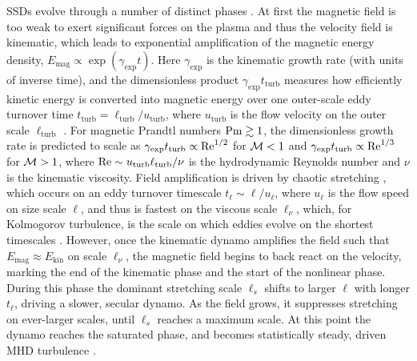     SSDs evolve through a number of distinct phases \citep{moffatt1970dynamo, vainshtein1972origin, kulsrud1992spectrum, schekochihin2002model, schekochihin2004simulations, maron2004nonlinear, rincon2019dynamo}. At first the magnetic field is too weak to exert significant forces on the plasma and thus the velocity field is kinematic, which leads to exponential amplification of the magnetic energy density, $E_\mathrm{mag} \propto \exp(\gamma_\mathrm{exp} t)$. Here $\gamma_\mathrm{exp}$ is the kinematic growth rate (with units of inverse time), and the dimensionless product $\gamma_\mathrm{exp} t_\mathrm{turb}$ measures how efficiently kinetic energy is converted into magnetic energy over one outer-scale eddy turnover time $t_\mathrm{turb} = \ell_\mathrm{turb}/u_\mathrm{turb}$, where $u_\mathrm{turb}$ is the flow velocity on the outer scale $\ell_\mathrm{turb}$ \citep{moffatt1970dynamo, kulsrud1992spectrum}. For magnetic Prandtl numbers $\mathrm{Pm} \gtrsim 1$, the dimensionless growth rate is predicted to scale as $\gamma_\mathrm{exp} t_\mathrm{turb} \propto \mathrm{Re}^{1/2}$ for $\mathcal{M} < 1$ and $\gamma_\mathrm{exp} t_\mathrm{turb} \propto \mathrm{Re}^{1/3}$ for $\mathcal{M} > 1$, where $\mathrm{Re} \sim u_\mathrm{turb} \ell_\mathrm{turb} / \nu$ is the hydrodynamic Reynolds number \citep{schober2012magnetic} and $\nu$ is the kinematic viscosity. Field amplification is driven by chaotic stretching \citep{rincon2019dynamo}, which occurs on an eddy turnover timescale $t_\ell \sim \ell/u_\ell$, where $u_\ell$ is the flow speed on size scale $\ell$, and thus is fastest on the viscous scale $\ell_\nu$, which, for Kolmogorov turbulence, is the scale on which eddies evolve on the shortest timescales \citep{bian2019decoupled, brandenburg2019reversed, grete2021matter, kriel2022fundamental, kriel2025fundamental, beattie2025taking}. However, once the kinematic dynamo amplifies the field such that $E_\mathrm{mag} \approx E_\mathrm{kin}$ on scale $\ell_\nu$, the magnetic field begins to back react on the velocity, marking the end of the kinematic phase and the start of the nonlinear phase. During this phase the dominant stretching scale $\ell_s$ shifts to larger $\ell$ with longer $t_\ell$, driving a slower, secular dynamo. As the field grows, it suppresses stretching on ever-larger scales, until $\ell_s$ reaches a maximum scale. At this point the dynamo reaches the saturated phase, and becomes statistically steady, driven MHD turbulence \citep{beattie2025spectrum}.

